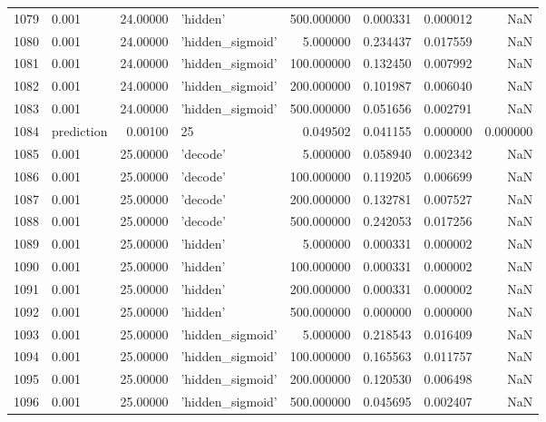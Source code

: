 \documentclass[10pt,a4paper]{article}
\begin{document}
\begin{tabular}{llrlrrrr}
1079 &       0.001 &  24.00000 &           'hidden' &  500.000000 &  0.000331 &  0.000012 &       NaN \\
1080 &       0.001 &  24.00000 &   'hidden\_sigmoid' &    5.000000 &  0.234437 &  0.017559 &       NaN \\
1081 &       0.001 &  24.00000 &   'hidden\_sigmoid' &  100.000000 &  0.132450 &  0.007992 &       NaN \\
1082 &       0.001 &  24.00000 &   'hidden\_sigmoid' &  200.000000 &  0.101987 &  0.006040 &       NaN \\
1083 &       0.001 &  24.00000 &   'hidden\_sigmoid' &  500.000000 &  0.051656 &  0.002791 &       NaN \\
1084 &  prediction &   0.00100 &                 25 &    0.049502 &  0.041155 &  0.000000 &  0.000000 \\
1085 &       0.001 &  25.00000 &           'decode' &    5.000000 &  0.058940 &  0.002342 &       NaN \\
1086 &       0.001 &  25.00000 &           'decode' &  100.000000 &  0.119205 &  0.006699 &       NaN \\
1087 &       0.001 &  25.00000 &           'decode' &  200.000000 &  0.132781 &  0.007527 &       NaN \\
1088 &       0.001 &  25.00000 &           'decode' &  500.000000 &  0.242053 &  0.017256 &       NaN \\
1089 &       0.001 &  25.00000 &           'hidden' &    5.000000 &  0.000331 &  0.000002 &       NaN \\
1090 &       0.001 &  25.00000 &           'hidden' &  100.000000 &  0.000331 &  0.000002 &       NaN \\
1091 &       0.001 &  25.00000 &           'hidden' &  200.000000 &  0.000331 &  0.000002 &       NaN \\
1092 &       0.001 &  25.00000 &           'hidden' &  500.000000 &  0.000000 &  0.000000 &       NaN \\
1093 &       0.001 &  25.00000 &   'hidden\_sigmoid' &    5.000000 &  0.218543 &  0.016409 &       NaN \\
1094 &       0.001 &  25.00000 &   'hidden\_sigmoid' &  100.000000 &  0.165563 &  0.011757 &       NaN \\
1095 &       0.001 &  25.00000 &   'hidden\_sigmoid' &  200.000000 &  0.120530 &  0.006498 &       NaN \\
1096 &       0.001 &  25.00000 &   'hidden\_sigmoid' &  500.000000 &  0.045695 &  0.002407 &       NaN \\

\end{tabular}
\end{document}
